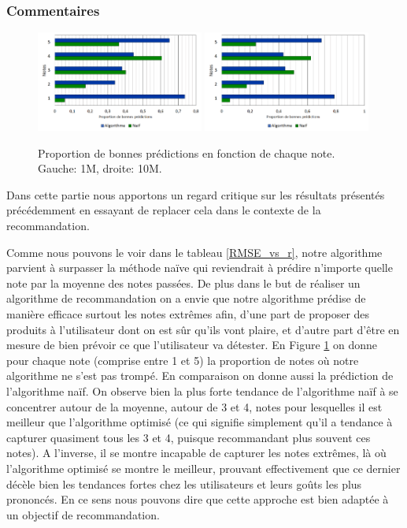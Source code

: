 \documentclass[10pt,a4paper]{article}
\begin{document}

\subsubsection*{Commentaires}

\begin{figure}[h]
\begin{center}
\includegraphics[width=0.49\textwidth]{fig/prop}
\includegraphics[width=0.49\textwidth]{fig/prop10m}
\caption{\label{graph_best} Proportion de bonnes prédictions en fonction de chaque note. Gauche: 1M, droite: 10M.}
\end{center}
\end{figure}

Dans cette partie nous apportons un regard critique sur les résultats présentés précédemment en essayant de replacer cela dans le contexte de la recommandation. 

Comme nous pouvons le voir dans le tableau \ref{RMSE_vs_r}, notre algorithme parvient à surpasser la méthode naïve qui reviendrait à prédire n'importe quelle note par la moyenne des notes passées. De plus dans le but de réaliser un algorithme de recommandation on a envie que notre algorithme prédise de manière efficace surtout les notes extrêmes afin, d'une part de proposer des produits à l'utilisateur dont on est sûr qu'ils vont plaire, et d'autre part d'être en mesure de bien prévoir ce que l'utilisateur va détester. En Figure \ref{graph_best} on donne pour chaque note (comprise entre 1 et 5) la proportion de notes où notre algorithme ne s'est pas trompé. En comparaison on donne aussi la prédiction de l'algorithme naïf. On observe bien la plus forte tendance de l'algorithme naïf à se concentrer autour de la moyenne, autour de 3 et 4, notes pour lesquelles il est meilleur que l'algorithme optimisé (ce qui signifie simplement qu'il a tendance à capturer quasiment tous les 3 et 4, puisque recommandant plus souvent ces notes). A l'inverse, il se montre incapable de capturer les notes extrêmes, là où l'algorithme optimisé se montre le meilleur, prouvant effectivement que ce dernier décèle bien les tendances fortes chez les utilisateurs et leurs goûts les plus prononcés. En ce sens nous pouvons dire que cette approche est bien adaptée à un objectif de recommandation.
\end{document}
